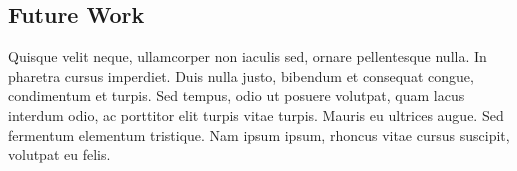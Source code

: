 \documentclass[10pt]{article}
\begin{document}
\begin{multicols}{2}
		\section{Future Work}
		Quisque velit neque, ullamcorper non iaculis sed, ornare pellentesque nulla. In pharetra cursus imperdiet. Duis nulla justo, bibendum et consequat congue, condimentum et turpis. Sed tempus, odio ut posuere volutpat, quam lacus interdum odio, ac porttitor elit turpis vitae turpis. Mauris eu ultrices augue. Sed fermentum elementum tristique. Nam ipsum ipsum, rhoncus vitae cursus suscipit, volutpat eu felis.

	\end{multicols}
\end{document}
